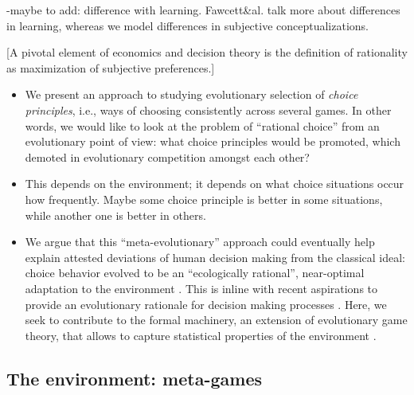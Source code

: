 \documentclass[fleqn,reqno,11pt]{article}
\begin{document}
-maybe to add: difference with learning. Fawcett\&al. talk more about differences in learning, whereas we model differences in subjective conceptualizations.


[A pivotal element of economics and decision theory is the definition of rationality as
maximization of subjective preferences.]



\begin{itemize}
\item We present an approach to studying evolutionary selection of \emph{choice principles},
  i.e., ways of choosing consistently across several games. In other words, we would like to
  look at the problem of ``rational choice'' from an evolutionary point of view: what choice
  principles would be promoted, which demoted in evolutionary competition amongst each other?

\item This depends on the environment; it depends on what choice situations occur how
  frequently. Maybe some choice principle is better in some situations, while another one is
  better in others. 


\item We argue that this ``meta-evolutionary'' approach could eventually help explain attested
  deviations of human decision making from the classical ideal: choice behavior evolved to be
  an ``ecologically rational'', near-optimal adaptation to the environment
  \citep{Anderson1990:The-Adaptive-Ch,Anderson1991:Is-human-cognit,GigerenzerGoldstein1996:Reasoning-the-F,ChaterOaksford2000:The-Rational-An}. This
  is inline with recent aspirations to provide an evolutionary rationale for decision making
  processes
  \citep[e.g.][]{HammersteinStevens2012:Six-Reasons-for,FawcettHamblin2013:Exposing-the-be}. Here,
  we seek to contribute to the formal machinery, an extension of evolutionary game theory, that
  allows to capture statistical properties of the environment
  \citep[cf.][]{McNamara2013:Towards-a-Riche}.
\end{itemize}



\subsection{The environment: meta-games}
\end{document}
